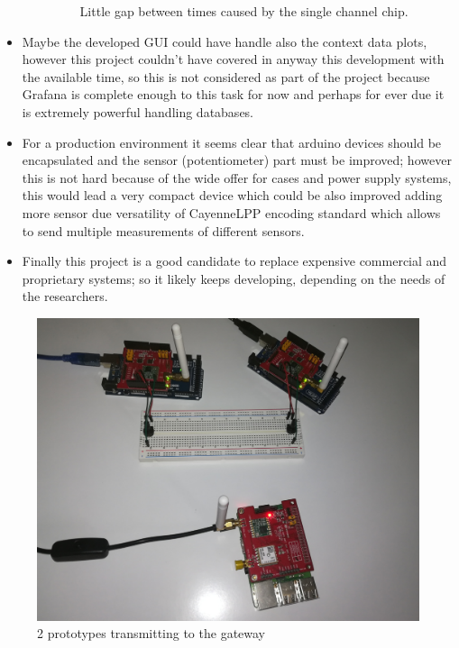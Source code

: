 \documentclass[11pt,a4paper,dvipsnames,twoside]{article}
\begin{document}
\begin{itemize}
\begin{itemize}
\begin{figure}[ht]
        \caption{Little gap between times caused by the single channel chip.}
        \label{fig:times_gap}
      \end{figure}
    \end{itemize}
    \item Maybe the developed GUI could have handle also the context data plots, however this project couldn't have covered in anyway this development with the available time, so this is not considered as part of the project because Grafana is complete enough to this task for now and perhaps for ever due it is extremely powerful handling databases.
    \item For a production environment it seems clear that arduino devices should be encapsulated and the sensor (potentiometer) part must be improved; however this is not hard because of the wide offer for cases and power supply systems, this would lead a very compact device which could be also improved adding more sensor due versatility of CayenneLPP encoding standard which allows to send multiple measurements of different sensors. 
    \item Finally this project is a good candidate to replace expensive commercial and proprietary systems; so it likely keeps developing, depending on the needs of the researchers.
\end{itemize}

\begin{figure}[ht]
  \centering
  \includegraphics[width=.9\textwidth]{../pictures/2prototypes_1gateway.jpg}  
  \caption{2 prototypes transmitting to the gateway}
  \label{fig:2nodes_gateway}
\end{figure}




















\newpage
{}
{}
\printbibliography
\end{document}

